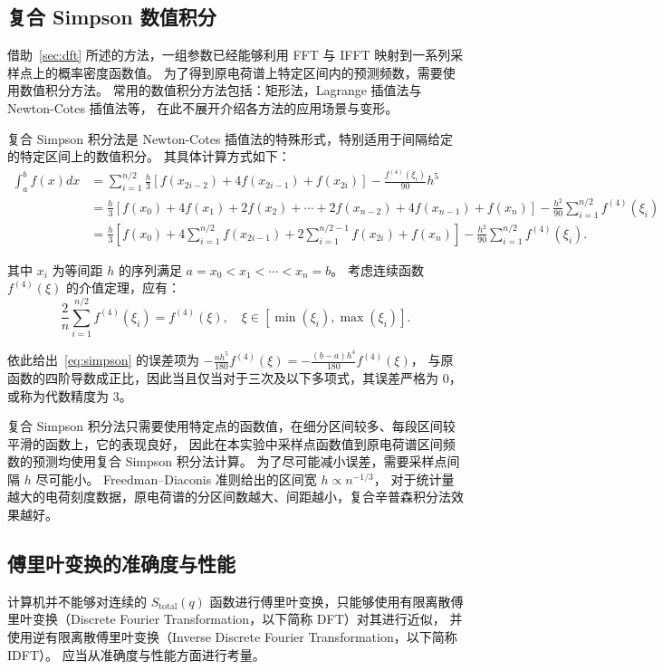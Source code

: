 \subsection{复合 Simpson 数值积分}
借助~\ref{sec:dft} 所述的方法，一组参数已经能够利用 FFT 与 IFFT 映射到一系列采样点上的概率密度函数值。
为了得到原电荷谱上特定区间内的预测频数，需要使用数值积分方法。
常用的数值积分方法包括：矩形法，Lagrange 插值法与 Newton-Cotes 插值法等，
在此不展开介绍各方法的应用场景与变形。

复合 Simpson 积分法是 Newton-Cotes 插值法的特殊形式，特别适用于间隔给定的特定区间上的数值积分。
其具体计算方式如下：
\begin{equation}
    \begin{aligned}
        \int_{a}^{b}f(x) dx
        &=\sum_{i=1}^{n/2}\frac{h}{3}\left[f(x_{2i-2})+4f(x_{2i-1})+f(x_{2i})\right]-\frac{f^{(4)}(\xi_i)}{90}h^5 \\
        &=\frac{h}{3}\left[f(x_0)+4f(x_1)+2f(x_2)+\cdots+2f(x_{n-2})+4f(x_{n-1})+f(x_n)\right]
        -\frac{h^2}{90}\sum_{i=1}^{n/2}f^{(4)}(\xi_i) \\
        &=\frac{h}{3}\left[f(x_{0})+4\sum_{i=1}^{n/2}f(x_{2i-1})+2\sum_{i=1}^{n/2-1}f(x_{2i})+f(x_{n})\right]
        -\frac{h^2}{90}\sum_{i=1}^{n/2}f^{(4)}(\xi_i).
    \end{aligned}
    \label{eq:simpson}
\end{equation}

其中 $x_i$ 为等间距 $h$ 的序列满足 $a=x_0<x_1<\cdots<x_n=b$。
考虑连续函数 $f^{(4)}(\xi)$ 的介值定理，应有：
\begin{equation}
    \frac{2}{n}\sum_{i=1}^{n/2}f^{(4)}(\xi_i)=f^{(4)}(\xi),\quad\xi\in\left[\min(\xi_i), \max(\xi_i)\right].
\end{equation}

依此给出~\eqref{eq:simpson} 的误差项为 $-\frac{nh^5}{180}f^{(4)}(\xi)=-\frac{(b-a)h^4}{180}f^{(4)}(\xi)$，
与原函数的四阶导数成正比，因此当且仅当对于三次及以下多项式，其误差严格为 0，或称为代数精度为 3。

复合 Simpson 积分法只需要使用特定点的函数值，在细分区间较多、每段区间较平滑的函数上，它的表现良好，
因此在本实验中采样点函数值到原电荷谱区间频数的预测均使用复合 Simpson 积分法计算。
为了尽可能减小误差，需要采样点间隔 $h$ 尽可能小。
Freedman–Diaconis 准则给出的区间宽 $h\propto n^{-1/3}$，
对于统计量越大的电荷刻度数据，原电荷谱的分区间数越大、间距越小，复合辛普森积分法效果越好。

\subsection{傅里叶变换的准确度与性能}
计算机并不能够对连续的 $S_{\text{total}}(q)$ 函数进行傅里叶变换，只能够使用有限离散傅里叶变换（Discrete Fourier Transformation，以下简称 DFT）对其进行近似，
并使用逆有限离散傅里叶变换（Inverse Discrete Fourier Transformation，以下简称 IDFT）。
应当从准确度与性能方面进行考量。

